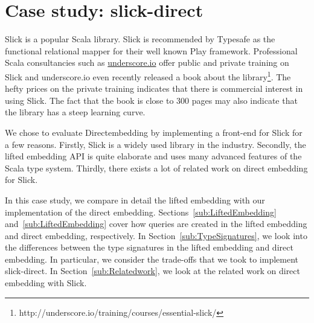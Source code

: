 \section{Case study: slick-direct} %
\label{sec:CaseStudy}
Slick is a popular Scala library.
Slick is recommended by Typesafe as the functional relational mapper for their well known Play framework.
Professional Scala consultancies such as \href{http://underscore.io}{underscore.io} offer public and private training on Slick and underscore.io even recently released a book about the library\footnote{http://underscore.io/training/courses/essential-slick/}.
The hefty prices on the private training indicates that there is commercial interest in using Slick.
The fact that the book is close to 300 pages may also indicate that the library has a steep learning curve.

We chose to evaluate Directembedding by implementing a front-end for Slick for a few reasons.
Firstly, Slick is a widely used library in the industry.
Secondly, the lifted embedding API is quite elaborate and uses many advanced features of the Scala type system.
Thirdly, there exists a lot of related work on direct embedding for Slick.

In this case study, we compare in detail the lifted embedding with our implementation of the direct embedding.
Sections~\ref{sub:LiftedEmbedding} and~\ref{sub:LiftedEmbedding} cover how queries are created in the lifted embedding and direct embedding, respectively.
In Section~\ref{sub:TypeSignatures}, we look into the differences between the type signatures in the lifted embedding and direct embedding.
In particular, we consider the trade-offs that we took to implement slick-direct.
In Section~\ref{sub:Relatedwork}, we look at the related work on direct embedding with Slick.

